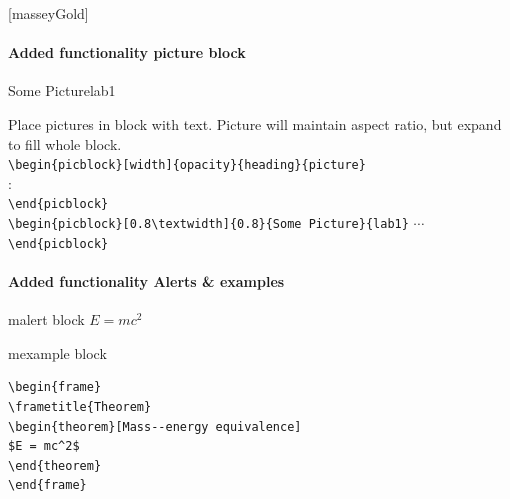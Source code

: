 \documentclass[10pt,aspectratio=43]{beamer}
\begin{document}

[masseyGold]
\begin{frame}[fragile]
\framesubtitle{Added functionality picture block}

\vspace*{-2ex}

\footnotesize
\def\picname{lab1}

\begin{picblock}[0.8\textwidth]{1}{Some Picture}{\picname}

\color{masseyBlack}

Place pictures in block with text.  Picture will maintain aspect ratio, but expand to fill whole block.\\

\verb|\begin{picblock}[width]{opacity}{heading}{picture}|\\
\hspace*{2em}:\\[1ex]
\verb|\end{picblock}|\\

\verb|\begin{picblock}[0.8\textwidth]{0.8}{Some Picture}{lab1}|
$\cdots$\verb|\end{picblock}|
\end{picblock}
\end{frame}



\begin{frame}[fragile]
\framesubtitle{Added functionality Alerts \& examples}
\begin{malert}[0.5\textwidth]{1}{malert block}
$E = mc^2$
\end{malert}

\begin{mexample}[0.8\textwidth]{1}{mexample block}
\begin{verbatim}
\begin{frame}
\frametitle{Theorem}
\begin{theorem}[Mass--energy equivalence]
$E = mc^2$
\end{theorem}
\end{frame}\end{verbatim}
\end{mexample}
\end{frame}
\end{document}
